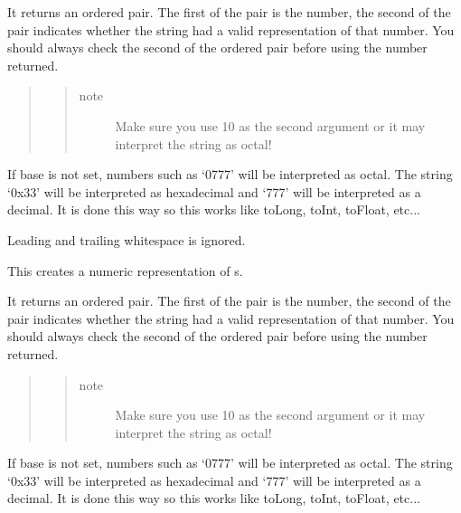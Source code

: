 \documentclass[letterpaper,10pt,english]{sphinxmanual}
\begin{document}
\begin{fulllineitems}
\begin{fulllineitems}
It returns an ordered pair.  The first of the pair is the number, the second of the pair indicates whether the string had a valid representation of that number.  You should always check the second of the ordered pair before using the number returned.
\begin{quote}
\begin{quote}\begin{description}
\item[{note}] \leavevmode
Make sure you use 10 as the second argument or it may interpret the string as octal!

\end{description}\end{quote}
\end{quote}

If base is not set, numbers such as `0777' will be interpreted as octal.  The string `0x33' will
be interpreted as hexadecimal and `777' will be interpreted as a decimal.  It is done this way
so this works like toLong, toInt, toFloat, etc...

Leading and trailing whitespace is ignored.

\end{fulllineitems}


\begin{fulllineitems}
\label{index:qsdn.QSDNLocale.toShort}
This creates a numeric representation of s.

It returns an ordered pair.  The first of the pair is the number, the second of the pair indicates whether the string had a valid representation of that number.  You should always check the second of the ordered pair before using the number returned.
\begin{quote}
\begin{quote}\begin{description}
\item[{note}] \leavevmode
Make sure you use 10 as the second argument or it may interpret the string as octal!

\end{description}\end{quote}
\end{quote}

If base is not set, numbers such as `0777' will be interpreted as octal.  The string `0x33' will
be interpreted as hexadecimal and `777' will be interpreted as a decimal.  It is done this way
so this works like toLong, toInt, toFloat, etc...


\end{fulllineitems}
\end{fulllineitems}
\end{document}
